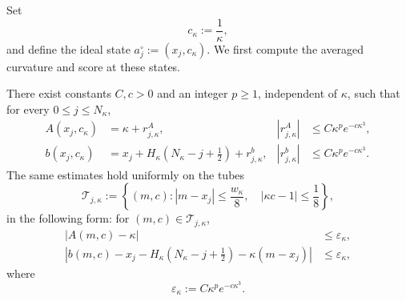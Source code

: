 Set
\begin{equation}
\label{eq:matched-covariance}
    c_\kappa:=\frac1\kappa,
\end{equation}
and define the ideal state $a_j^\circ:=(x_j,c_\kappa)$.  We first compute the averaged
curvature and score at these states.

\begin{lemma}
\label{lem:bump-averages}
There exist constants $C,c>0$ and an integer $p\geq1$, independent of $\kappa$, such that
for every $0\leq j\leq N_\kappa$,
\begin{align}
\label{eq:center-A-estimate}
    A(x_j,c_\kappa)
    &=\kappa+r^A_{j,\kappa},
    &|r^A_{j,\kappa}|
    &\leq C\kappa^p e^{-c\kappa^3},\\
\label{eq:center-b-estimate}
    b(x_j,c_\kappa)
    &=x_j+H_\kappa\left(N_\kappa-j+\frac12\right)
      +r^b_{j,\kappa},
    &|r^b_{j,\kappa}|
    &\leq C\kappa^p e^{-c\kappa^3}.
\end{align}
The same estimates hold uniformly on the tubes
\begin{equation}
\label{eq:bump-tube}
    \mathcal T_{j,\kappa}
    :=\left\{
        (m,c):
        |m-x_j|\leq\frac{w_\kappa}{8},
        \quad
        |\kappa c-1|\leq\frac18
    \right\},
\end{equation}
in the following form: for $(m,c)\in\mathcal T_{j,\kappa}$,
\begin{align}
\label{eq:tube-A}
    |A(m,c)-\kappa|
    &\leq \varepsilon_\kappa,\\
\label{eq:tube-b}
    \left|
        b(m,c)
        -x_j-H_\kappa\left(N_\kappa-j+\frac12\right)
        -\kappa(m-x_j)
    \right|
    &\leq \varepsilon_\kappa,
\end{align}
where
\begin{equation}
\label{eq:epsilon-kappa}
    \varepsilon_\kappa:=C\kappa^p e^{-c\kappa^3}.
\end{equation}
\end{lemma}

